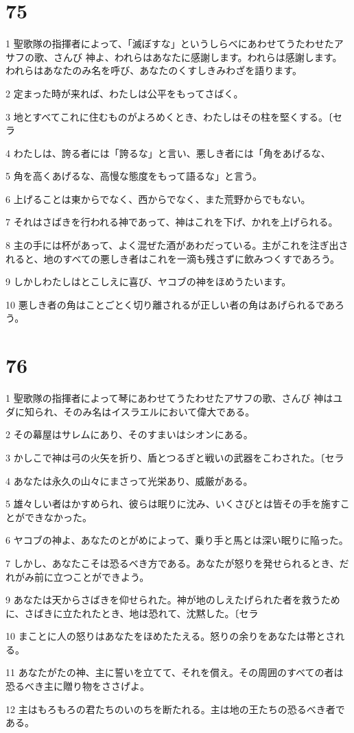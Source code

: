 \chapter{75}

\par 1 聖歌隊の指揮者によって、「滅ぼすな」というしらべにあわせてうたわせたアサフの歌、さんび 神よ、われらはあなたに感謝します。われらは感謝します。われらはあなたのみ名を呼び、あなたのくすしきみわざを語ります。
\par 2 定まった時が来れば、わたしは公平をもってさばく。
\par 3 地とすべてこれに住むものがよろめくとき、わたしはその柱を堅くする。〔セラ
\par 4 わたしは、誇る者には「誇るな」と言い、悪しき者には「角をあげるな、
\par 5 角を高くあげるな、高慢な態度をもって語るな」と言う。
\par 6 上げることは東からでなく、西からでなく、また荒野からでもない。
\par 7 それはさばきを行われる神であって、神はこれを下げ、かれを上げられる。
\par 8 主の手には杯があって、よく混ぜた酒があわだっている。主がこれを注ぎ出されると、地のすべての悪しき者はこれを一滴も残さずに飲みつくすであろう。
\par 9 しかしわたしはとこしえに喜び、ヤコブの神をほめうたいます。
\par 10 悪しき者の角はことごとく切り離されるが正しい者の角はあげられるであろう。

\chapter{76}

\par 1 聖歌隊の指揮者によって琴にあわせてうたわせたアサフの歌、さんび 神はユダに知られ、そのみ名はイスラエルにおいて偉大である。
\par 2 その幕屋はサレムにあり、そのすまいはシオンにある。
\par 3 かしこで神は弓の火矢を折り、盾とつるぎと戦いの武器をこわされた。〔セラ
\par 4 あなたは永久の山々にまさって光栄あり、威厳がある。
\par 5 雄々しい者はかすめられ、彼らは眠りに沈み、いくさびとは皆その手を施すことができなかった。
\par 6 ヤコブの神よ、あなたのとがめによって、乗り手と馬とは深い眠りに陥った。
\par 7 しかし、あなたこそは恐るべき方である。あなたが怒りを発せられるとき、だれがみ前に立つことができよう。
\par 9 あなたは天からさばきを仰せられた。神が地のしえたげられた者を救うために、さばきに立たれたとき、地は恐れて、沈黙した。〔セラ
\par 10 まことに人の怒りはあなたをほめたたえる。怒りの余りをあなたは帯とされる。
\par 11 あなたがたの神、主に誓いを立てて、それを償え。その周囲のすべての者は恐るべき主に贈り物をささげよ。
\par 12 主はもろもろの君たちのいのちを断たれる。主は地の王たちの恐るべき者である。

